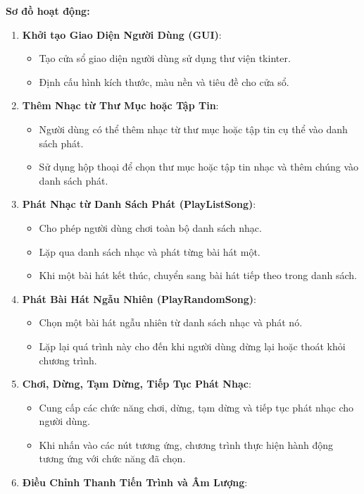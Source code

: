 \documentclass[a4paper]{article}
\begin{document}
\textbf{Sơ đồ hoạt động:}
\begin{enumerate}
    \item \textbf{Khởi tạo Giao Diện Người Dùng (GUI)}:
    \begin{itemize}
        \item Tạo cửa sổ giao diện người dùng sử dụng thư viện tkinter.
        \item Định cấu hình kích thước, màu nền và tiêu đề cho cửa sổ.
    \end{itemize}
    \item \textbf{Thêm Nhạc từ Thư Mục hoặc Tập Tin}:
    \begin{itemize}
        \item Người dùng có thể thêm nhạc từ thư mục hoặc tập tin cụ thể vào danh sách phát.
        \item Sử dụng hộp thoại để chọn thư mục hoặc tập tin nhạc và thêm chúng vào danh sách phát.
    \end{itemize}
    \item \textbf{Phát Nhạc từ Danh Sách Phát (PlayListSong)}:
    \begin{itemize}
        \item Cho phép người dùng chơi toàn bộ danh sách nhạc.
        \item Lặp qua danh sách nhạc và phát từng bài hát một.
        \item Khi một bài hát kết thúc, chuyển sang bài hát tiếp theo trong danh sách.
    \end{itemize}
    \item \textbf{Phát Bài Hát Ngẫu Nhiên (PlayRandomSong)}:
    \begin{itemize}
        \item Chọn một bài hát ngẫu nhiên từ danh sách nhạc và phát nó.
        \item Lặp lại quá trình này cho đến khi người dùng dừng lại hoặc thoát khỏi chương trình.
    \end{itemize}
    \item \textbf{Chơi, Dừng, Tạm Dừng, Tiếp Tục Phát Nhạc}:
    \begin{itemize}
        \item Cung cấp các chức năng chơi, dừng, tạm dừng và tiếp tục phát nhạc cho người dùng.
        \item Khi nhấn vào các nút tương ứng, chương trình thực hiện hành động tương ứng với chức năng đã chọn.
    \end{itemize}
    \item \textbf{Điều Chỉnh Thanh Tiến Trình và Âm Lượng}:

\end{enumerate}
\end{document}
